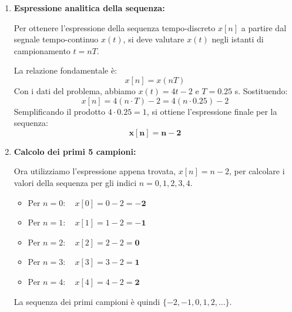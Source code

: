 
\begin{soluzione}{1}
    \begin{enumerate}
        \item \textbf{Espressione analitica della sequenza:}
        
        Per ottenere l'espressione della sequenza tempo-discreto $x[n]$ a partire dal segnale tempo-continuo $x(t)$, si deve valutare $x(t)$ negli istanti di campionamento $t = nT$.
        
        La relazione fondamentale è:
        \[
            x[n] = x(nT)
        \]
        Con i dati del problema, abbiamo $x(t) = 4t - 2$ e $T = 0.25$ s. Sostituendo:
        \[
            x[n] = 4(n \cdot T) - 2 = 4(n \cdot 0.25) - 2
        \]
        Semplificando il prodotto $4 \cdot 0.25 = 1$, si ottiene l'espressione finale per la sequenza:
        \[
            \mathbf{x[n] = n - 2}
        \]
        
        \item \textbf{Calcolo dei primi 5 campioni:}
        
        Ora utilizziamo l'espressione appena trovata, $x[n] = n - 2$, per calcolare i valori della sequenza per gli indici $n = 0, 1, 2, 3, 4$.
        \begin{itemize}
            \item Per $n=0: \quad x[0] = 0 - 2 = \mathbf{-2}$
            \item Per $n=1: \quad x[1] = 1 - 2 = \mathbf{-1}$
            \item Per $n=2: \quad x[2] = 2 - 2 = \mathbf{0}$
            \item Per $n=3: \quad x[3] = 3 - 2 = \mathbf{1}$
            \item Per $n=4: \quad x[4] = 4 - 2 = \mathbf{2}$
        \end{itemize}
        La sequenza dei primi campioni è quindi $\{-2, -1, 0, 1, 2, \dots\}$.
    \end{enumerate}
\end{soluzione}